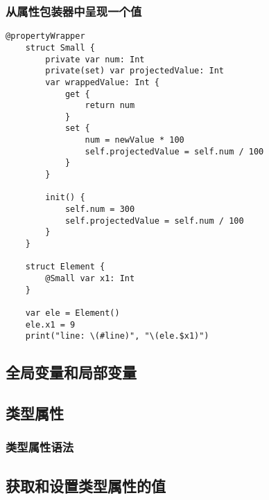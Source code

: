 \documentclass{../main.tex}{subfiles}
\begin{document}
\subsubsection{从属性包装器中呈现一个值}
\begin{lstlisting}[style = CodeLstStyleSwift, caption = {从属性包装器中呈现一个值}]
    @propertyWrapper
    struct Small {
        private var num: Int
        private(set) var projectedValue: Int
        var wrappedValue: Int {
            get {
                return num
            }
            set {
                num = newValue * 100
                self.projectedValue = self.num / 100
            }
        }
    
        init() {
            self.num = 300
            self.projectedValue = self.num / 100
        }
    }
    
    struct Element {
        @Small var x1: Int
    }
    
    var ele = Element()
    ele.x1 = 9
    print("line: \(#line)", "\(ele.$x1)")    
\end{lstlisting}

\subsection{全局变量和局部变量}
\subsection{类型属性}
\subsubsection{类型属性语法}
\subsection{获取和设置类型属性的值}
\end{document}
